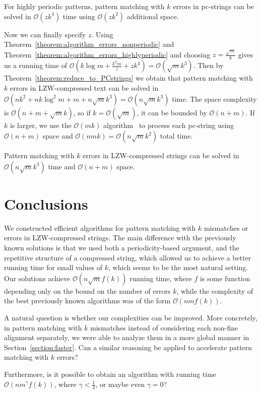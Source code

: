 \documentclass[runningheads]{llncs}
\begin{document}
\begin{theorem}\label{theorem:algorithm_errors_highlyperiodic}
For highly periodic patterns, pattern matching with $k$ errors in pc-strings can be solved in $\mathcal{O}(zk^4)$ time using $\mathcal{O}(zk^2)$ additional space.
\end{theorem}

Now we can finally specify $z$. Using Theorem~\ref{theorem:algorithm_errors_nonperiodic} and Theorem~\ref{theorem:algorithm_errors_highlyperiodic} and choosing $z=\frac{\sqrt{m}}{k}$ gives us a running time of $\mathcal{O}(k\log m+\frac{k^{2}m}{z}+zk^{4})=\mathcal{O}(\sqrt{m}k^{3})$. Then by Theorem~\ref{theorem:reduce_to_PCstrings} we obtain that pattern matching with $k$ errors in LZW-compressed text can be solved in $\mathcal{O}(nk^{2}+nk\log^{2}m+m+n\sqrt{m}k^{3})=\mathcal{O}(n\sqrt{m}k^{3})$ time. The space complexity is $\mathcal{O}(n+m+\sqrt{m}{k})$, so if $k=\mathcal{O}(\sqrt{m})$, it can be bounded by $\mathcal{O}(n+m)$. If $k$ is larger, we use the $\mathcal{O}(mk)$ algorithm~\cite{Landau} to process each pc-string using $\mathcal{O}(n+m)$ space and $\mathcal{O}(nmk)=\mathcal{O}(n\sqrt{m}k^2)$ total time.

\begin{theorem}
Pattern matching with $k$ errors in LZW-compressed strings can be solved in $\mathcal{O}(n\sqrt{m}k^{3})$ time and $\mathcal{O}(n+m)$ space.
\end{theorem}

\section{Conclusions}

We constructed efficient algorithms for pattern matching with $k$ mismatches or errors in LZW-compressed strings. The main difference with the previously known solutions is that we used both a periodicity-based argument, and the repetitive structure of a compressed string, which allowed us to achieve a better running time for small values of $k$, which seems to be the most natural setting. Our solutions achieve $\mathcal{O}(n\sqrt{m}f(k))$ running time, where $f$ is some function depending only on the bound on the number of errors $k$, while the complexity of the best previously known algorithms was of the form $\mathcal{O}(nmf(k))$.

A natural question is whether our complexities can be improved. More concretely, in pattern matching with $k$ mismatches instead of considering each non-fine alignment separately, we were able to analyze them in a more global manner in Section~\ref{section:faster}. Can a similar reasoning be applied to accelerate pattern matching with $k$ errors?

Furthermore, is it possible to obtain an algorithm with running time $\mathcal{O}(nm^{\gamma}f(k))$, where $\gamma<\frac{1}{2}$, or maybe even $\gamma=0$?



\end{document}
